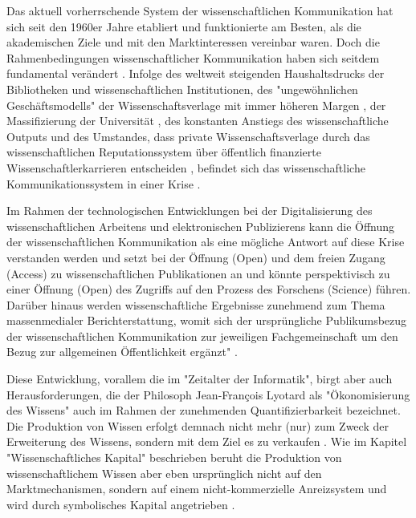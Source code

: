 Das aktuell vorherrschende System der wissenschaftlichen Kommunikation hat sich seit den 1960er Jahre etabliert und funktionierte am Besten, als die akademischen Ziele und mit den Marktinteressen vereinbar waren. Doch die Rahmenbedingungen wissenschaftlicher Kommunikation haben sich seitdem fundamental verändert \cite{epaa_Weiner_2001}. Infolge des weltweit steigenden Haushaltsdrucks der Bibliotheken und wissenschaftlichen Institutionen, des "ungewöhnlichen Geschäftsmodells" \cite{cite:12} der Wissenschaftsverlage mit immer höheren Margen \cite{albert_2006_open_implications}, der Massifizierung der Universität \cite{binswanger_2014_excellence}, des konstanten Anstiegs des wissenschaftliche Outputs \cite[:23]{haustein_2012_multidimensional} und des Umstandes, dass private Wissenschaftsverlage durch das wissenschaftlichen Reputationssystem über öffentlich finanzierte Wissenschaftlerkarrieren entscheiden \cite{heise_2012}, befindet sich das wissenschaftliche Kommunikationssystem in einer Krise \cite{cite:14}.

Im Rahmen der technologischen Entwicklungen bei der Digitalisierung des wissenschaftlichen Arbeitens und elektronischen Publizierens kann die Öffnung der wissenschaftlichen Kommunikation als eine mögliche Antwort auf diese Krise verstanden werden und setzt bei der Öffnung (Open) und dem freien Zugang (Access) zu wissenschaftlichen Publikationen an und könnte perspektivisch zu einer Öffnung (Open) des Zugriffs auf den Prozess des Forschens (Science) führen. Darüber hinaus werden wissenschaftliche Ergebnisse zunehmend zum Thema massenmedialer Berichterstattung, womit sich der ursprüngliche Publikumsbezug der wissenschaftlichen Kommunikation zur jeweiligen Fachgemeinschaft um den Bezug zur allgemeinen Öffentlichkeit ergänzt" \cite{bbaw_publizieren_2015} .

Diese Entwicklung, vorallem die im "Zeitalter der Informatik", birgt aber auch Herausforderungen, die der Philosoph Jean-François Lyotard als "Ökonomisierung des Wissens" \cite{lyotard_1993_postmoderne} auch im Rahmen der zunehmenden Quantifizierbarkeit bezeichnet. Die Produktion von Wissen erfolgt demnach nicht mehr (nur) zum Zweck der Erweiterung des Wissens, sondern mit dem Ziel es zu verkaufen \cite[:156]{troy_2012_wissen}. Wie im Kapitel "Wissenschaftliches Kapital" beschrieben beruht die Produktion von wissenschaftlichem Wissen aber eben ursprünglich nicht auf den Marktmechanismen, sondern auf einem nicht-kommerzielle Anreizsystem und wird durch symbolisches Kapital angetrieben \cite[:157]{troy_2012_wissen}.

